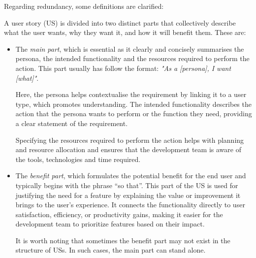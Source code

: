Regarding redundancy, some definitions are clarified:
\begin{definition}
	A user story (US) is divided into two distinct parts that collectively describe what the user wants, why they want it, and how it will benefit them. These are:
	\begin{itemize}
		\item The \textit{main part}, which is essential as it clearly and concisely summarises the persona, the intended functionality and the resources required to perform the action. This part usually has follow the format: \textit{"As a [persona], I want [what]"}. 
		
		Here, the persona helps contextualise the requirement by linking it to a user type, which promotes understanding. The intended functionality describes the action that the persona wants to perform or the function they need, providing a clear statement of the requirement.
		
		Specifying the resources required to perform the action helps with planning and resource allocation and ensures that the development team is aware of the tools, technologies and time required.
		
		\item The \textit{benefit part}, which formulates the potential benefit for the end user and typically begins with the phrase \enquote{so that}. This part of the US is used for justifying the need for a feature by explaining the value or improvement it brings to the user's experience. It connects the functionality directly to user satisfaction, efficiency, or productivity gains, making it easier for the development team to prioritize features based on their impact.
		
		It is worth noting that sometimes the benefit part may not exist in the structure of USs. In such cases, the main part can stand alone.
	\end{itemize}
\end{definition}
